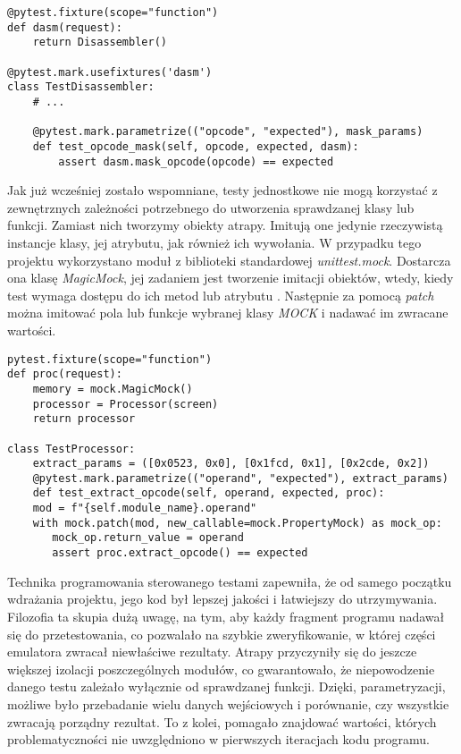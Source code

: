 \begin{lstlisting}[caption={Przykład poprzedniego testu z użyciem \textit{fixture}.},captionpos=b]
@pytest.fixture(scope="function")
def dasm(request):
    return Disassembler()

@pytest.mark.usefixtures('dasm')
class TestDisassembler:
    # ...
    
    @pytest.mark.parametrize(("opcode", "expected"), mask_params)
    def test_opcode_mask(self, opcode, expected, dasm):
        assert dasm.mask_opcode(opcode) == expected
\end{lstlisting}
Jak już wcześniej zostało wspomniane, testy jednostkowe nie mogą korzystać z zewnętrznych zależności potrzebnego do utworzenia sprawdzanej klasy lub funkcji. Zamiast nich tworzymy obiekty atrapy. Imitują one jedynie rzeczywistą instancje klasy, jej atrybutu, jak również ich wywołania. W przypadku tego projektu wykorzystano moduł z biblioteki standardowej \textit{unittest.mock}. Dostarcza ona klasę \textit{MagicMock}, jej zadaniem jest tworzenie imitacji obiektów, wtedy, kiedy test wymaga dostępu do ich metod lub atrybutu \cite{MOCK}. Następnie za pomocą \textit{patch} można imitować pola lub funkcje wybranej klasy \textit{MOCK} i nadawać im zwracane wartości.
\begin{lstlisting}[caption={Przykład przykład testowania za pomocą atrap}, captionpos=b]
pytest.fixture(scope="function")
def proc(request):
    memory = mock.MagicMock()
    processor = Processor(screen)
    return processor
    
class TestProcessor:
    extract_params = ([0x0523, 0x0], [0x1fcd, 0x1], [0x2cde, 0x2])
    @pytest.mark.parametrize(("operand", "expected"), extract_params)
    def test_extract_opcode(self, operand, expected, proc):
    mod = f"{self.module_name}.operand"
    with mock.patch(mod, new_callable=mock.PropertyMock) as mock_op:
       mock_op.return_value = operand
       assert proc.extract_opcode() == expected
\end{lstlisting}

Technika programowania sterowanego testami zapewniła, że od samego początku wdrażania projektu, jego kod był lepszej jakości i łatwiejszy do utrzymywania. Filozofia ta skupia dużą uwagę, na tym, aby każdy fragment programu nadawał się do przetestowania, co pozwalało na szybkie zweryfikowanie, w której części emulatora zwracał niewłaściwe rezultaty. Atrapy przyczyniły się do jeszcze większej izolacji poszczególnych modułów, co gwarantowało, że niepowodzenie danego testu zależało wyłącznie od sprawdzanej funkcji. Dzięki, parametryzacji, możliwe było przebadanie wielu danych wejściowych i porównanie, czy wszystkie zwracają porządny rezultat. To z kolei, pomagało znajdować wartości, których problematyczności nie uwzględniono w pierwszych iteracjach kodu programu.
